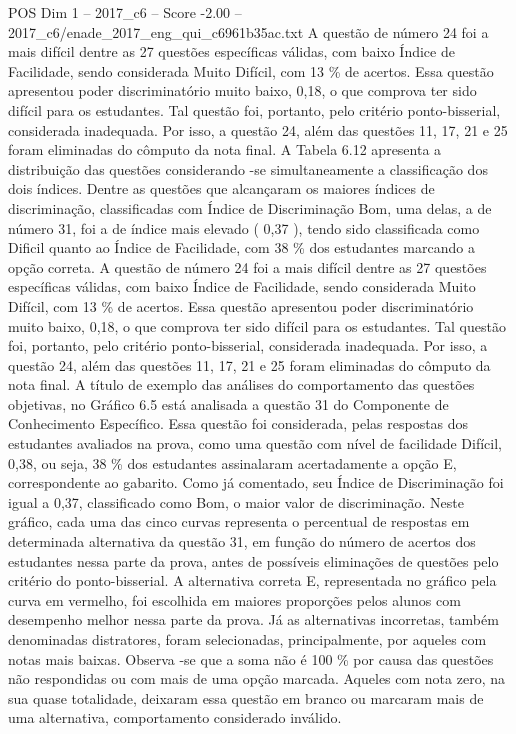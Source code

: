 \begin{textsample}{POS Dim 1 – 2017\_c6 – Score -2.00 – 2017\_c6/enade\_2017\_eng\_qui\_c6961b35ac.txt}
A questão de número 24 foi a mais difícil dentre as 27 questões específicas válidas, com baixo Índice de Facilidade, sendo considerada Muito Difícil, com 13 \% de acertos.
Essa questão apresentou poder discriminatório muito baixo, 0,18, o que comprova ter sido difícil para os estudantes.
Tal questão foi, portanto, pelo critério ponto-bisserial, considerada inadequada.
Por isso, a questão 24, além das questões 11, 17, 21 e 25 foram eliminadas do cômputo da nota final.
A Tabela 6.12 apresenta a distribuição das questões considerando -se simultaneamente a classificação dos dois índices.
Dentre as questões que alcançaram os maiores índices de discriminação, classificadas com Índice de Discriminação Bom, uma delas, a de número 31, foi a de índice mais elevado ( 0,37 ), tendo sido classificada como Dificil quanto ao Índice de Facilidade, com 38 \% dos estudantes marcando a opção correta.
A questão de número 24 foi a mais difícil dentre as 27 questões específicas válidas, com baixo Índice de Facilidade, sendo considerada Muito Difícil, com 13 \% de acertos.
Essa questão apresentou poder discriminatório muito baixo, 0,18, o que comprova ter sido difícil para os estudantes.
Tal questão foi, portanto, pelo critério ponto-bisserial, considerada inadequada.
Por isso, a questão 24, além das questões 11, 17, 21 e 25 foram eliminadas do cômputo da nota final.
A título de exemplo das análises do comportamento das questões objetivas, no Gráfico 6.5 está analisada a questão 31 do Componente de Conhecimento Específico.
Essa questão foi considerada, pelas respostas dos estudantes avaliados na prova, como uma questão com nível de facilidade Difícil, 0,38, ou seja, 38 \% dos estudantes assinalaram acertadamente a opção E, correspondente ao gabarito.
Como já comentado, seu Índice de Discriminação foi igual a 0,37, classificado como Bom, o maior valor de discriminação.
Neste gráfico, cada uma das cinco curvas representa o percentual de respostas em determinada alternativa da questão 31, em função do número de acertos dos estudantes nessa parte da prova, antes de possíveis eliminações de questões pelo critério do ponto-bisserial.
A alternativa correta E, representada no gráfico pela curva em vermelho, foi escolhida em maiores proporções pelos alunos com desempenho melhor nessa parte da prova.
Já as alternativas incorretas, também denominadas distratores, foram selecionadas, principalmente, por aqueles com notas mais baixas.
Observa -se que a soma não é 100 \% por causa das questões não respondidas ou com mais de uma opção marcada.
Aqueles com nota zero, na sua quase totalidade, deixaram essa questão em branco ou marcaram mais de uma alternativa, comportamento considerado inválido.

\end{textsample}
